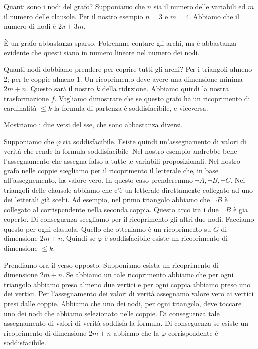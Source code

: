 Quanti sono i nodi del grafo? Supponiamo che $n$ sia il numero delle variabili ed $m$ il numero
delle clausole. Per il nostro esempio $n=3$ e $m=4$. Abbiamo che il numero di nodi è $2n + 3m$.

È un grafo abbastanza sparso. Potremmo contare gli archi, ma è abbastanza evidente che questi
siano in numero lineare nel numero dei nodi.

Quanti nodi dobbiamo prendere per coprire tutti gli archi? Per i triangoli almeno 2; per le coppie
almeno 1. Un ricoprimento deve avere una dimensione minima $2m + n$. Questo sarà il nostro $k$
della riduzione. Abbiamo quindi la nostra trasformazione $f$. Vogliamo dimostrare che se questo
grafo ha un ricoprimento di cardinalità $\leq k$ la formula di partenza è soddisfacibile, e
viceversa.

Mostriamo i due versi del sse, che sono abbastanza diversi.

Supponiamo che $\varphi$ sia soddisfacibile. Esiste quindi un'assegnamento di valori di verità che
rende la formula soddisfacibile. Nel nostro esempio andrebbe bene l'assegnamento che assegna falso a
tutte le variabili proposizionali. Nel nostro grafo nelle coppie scegliamo per il ricoprimento il
letterale che, in base all'assegnemento, ha valore vero. In questo caso prenderemmo $\lnot A, \lnot
B, \lnot C$. Nei triangoli delle clausole abbiamo che c'è un letterale direttamente collegato ad
uno dei letterali già scelti. Ad esempio, nel primo triangolo abbiamo che $\lnot B$ è collegato al
corrispondente nella seconda coppia. Questo arco tra i due $\lnot B$ è gia coperto. Di conseguenza
scegliamo per il ricoprimento gli altri due nodi. Facciamo questo per ogni clasuola. Quello che
otteniamo è un ricoprimento su $G$ di dimensione $2m + n$. Quindi se $\varphi$ è soddisfacibile
esiste un ricoprimento di dimensione $\leq k$.

Prendiamo ora il verso opposto. Supponiamo esista un ricoprimento di dimensione $2m + n$. Se abbiamo
un tale ricoprimento abbiamo che per ogni triangolo abbiamo preso almeno due vertici e per ogni
coppia abbiamo preso uno dei vertici. Per l'assegnamento dei valori di verità assegnamo valore vero
ai vertici presi dalle coppie. Abbiamo che uno dei nodi, per ogni triangolo, deve toccare uno dei
nodi che abbiamo selezionato nelle coppie. Di conseguenza tale assegnamento di valori di verità
soddisfa la formula. Di conseguenza se esiste un ricoprimento di dimensione $2m + n$ abbiamo che la
$\varphi$ corrispondente è soddisfacibile.

